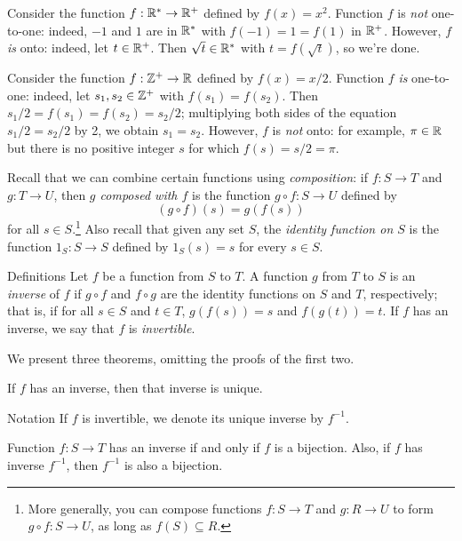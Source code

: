 \begin{example}{} Consider the function $f: \mathbb{R}^* \to \mathbb{R}^+$ defined by $f(x)=x^2$. Function $f$ is \textit{not} one-to-one: indeed,
$-1$ and $1$ are in $\mathbb{R}^*$ with $f(-1)=1=f(1)$ in $\mathbb{R}^+$.
However, $f$ \textit{is} onto: indeed, let $t\in \mathbb{R}^+$.  Then
$\sqrt{t} \in \mathbb{R}^*$ with $t=f(\sqrt{t})$, so we're done. \end{example}

\begin{example}{} Consider the function $f: \mathbb{Z}^+ \to \mathbb{R}$ defined by $f(x)=x/2$. Function $f$ \textit{is} one-to-one: indeed, let $s_1, s_2 \in \mathbb{Z}^+$ with $f(s_1)=f(s_2)$.
Then $s_1/2=f(s_1)=f(s_2)=s_2/2$; multiplying both sides of the equation $s_1/2=s_2/2$ by 2, we obtain $s_1=s_2$. However, $f$ is \textit{not} onto: for example, $\pi\in \mathbb{R}$
but there is no positive integer $s$ for which $f(s)=s/2=\pi$.\end{example}


Recall that we can combine certain functions using \textit{composition}:
if $f:S\to T$ and $g:T\to U$, then \textit{$g$ composed with $f$} is the function $g\circ f: S\to U$ defined by
$$(g\circ f)(s)=g(f(s))$$ for all $s\in S$.\footnote{More generally, you can compose functions $f:S\to T$ and $g:R\to U$ to form $g\circ f:S\to U$,  as long as $f(S)\subseteq R$.} Also recall that given any set $S$, the \textit{identity function on $S$} is the function $1_S: S\to S$ defined by $1_S(s)=s$ for every $s\in S$.


\begin{df}{Definitions} Let $f$ be a function from $S$ to $T$.  A function $g$
from $T$ to $S$ is an \textit{inverse} of $f$ if $g\circ f$ and
$f\circ g$ are the identity functions on $S$ and $T$,
respectively; that is, if for all $s\in S$ and $t\in
T$, $g(f(s))=s$ and $f(g(t))=t$.  If $f$ has an inverse, we say that $f$ is \textit{invertible}.\end{df}

\smallskip
We present three theorems, omitting the
proofs of the first two.
\begin{thm}\label{}
If $f$ has an inverse, then that inverse is unique. \end{thm}

\begin{df}{Notation} If $f$ is invertible, we denote its unique inverse by $f^{-1}$.
\end{df}

\begin{thm}\label{invbij}
Function $f:S\to T$ has an inverse if and only if $f$ is a bijection. Also, if $f$ has inverse $f^{-1}$, then $f^{-1}$ is also a bijection. \end{thm}

